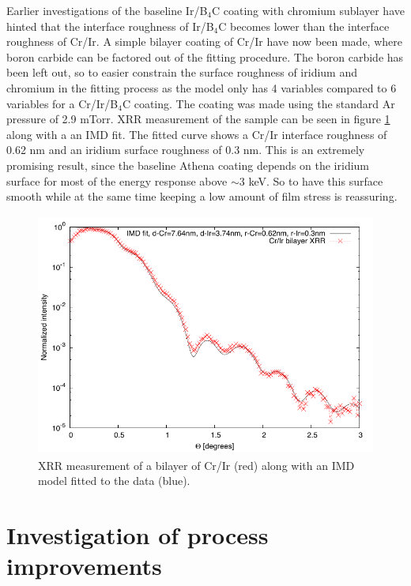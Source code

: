 Earlier investigations of the baseline Ir/B$_4$C coating with chromium sublayer\cite{Jakobsen:2011vd} have hinted that the interface roughness of Ir/B$_4$C becomes lower than the interface roughness of Cr/Ir. A simple bilayer coating of Cr/Ir have now been made, where boron carbide can be factored out of the fitting procedure. The boron carbide has been left out, so to easier constrain the surface roughness of iridium and chromium in the fitting process as the model only has 4 variables compared to 6 variables for a Cr/Ir/B$_4$C coating. The coating was made using the standard Ar pressure of 2.9 mTorr. XRR measurement of the sample can be seen in figure \ref{fig:cr-ir-fit} along with a an IMD fit. The fitted curve shows a Cr/Ir interface roughness of 0.62 nm and an iridium surface roughness of 0.3 nm.
This is an extremely promising result, since the baseline Athena coating depends on the iridium surface for most of the energy response above $\sim$3 keV. So to have this surface smooth while at the same time keeping a low amount of film stress is reassuring.

\begin{figure}[!h]
	\center
	\includegraphics[height=8cm]{figures/athena/coatings/cr-ir-fit.pdf}
\caption{\footnotesize XRR measurement of a bilayer of Cr/Ir (red) along with an IMD model fitted to the data (blue).}\label{fig:cr-ir-fit}
\end{figure}

\section{Investigation of process improvements}



